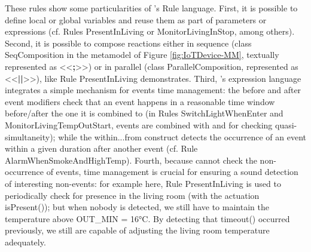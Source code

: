 These rules show some particularities of \IOTDSL's Rule language. First, it is possible to define local or global variables and reuse them as part of parameters or expressions (cf. Rules \textsf{PresentInLiving} or \textsf{MonitorLivingInStop}, among others). Second, it is possible to compose reactions either in sequence (class \textsf{SeqComposition} in the metamodel of Figure \ref{fig:IoTDevice-MM}, textually represented as \textsf{<<\textbf{;}>>}) or in parallel (class \textsf{ParallelComposition}, represented as <<\textsf{\textbf{||}}>>), like Rule \textsf{PresentInLiving} demonstrates. Third, \IOTDSL's expression language integrates a simple mechanism for events time management: the \textsf{before} and \textsf{after} event modifiers check that an event happens in a reasonable time window before/after the one it is combined to (in Rules \textsf{SwitchLightWhenEnter} and \textsf{MonitorLivingTempOutStart}, events are combined with \textsf{and} for checking quasi-simultaneity); while the \textsf{within...from} construct detects the occurrence of an event within a given duration after another event (cf. Rule \textsf{AlarmWhenSmokeAndHighTemp}). Fourth, because \IOTDSL cannot check the non-occurrence of events, time management is crucial for ensuring a sound detection of interesting non-events: for example here, Rule \textsf{PresentInLiving} is used to periodically check for presence in the living room (with the actuation \textsf{isPresent()}); but when nobody is detected, we still have to maintain the temperature above \textsf{OUT\_MIN} = 16°C. By detecting that \textsf{timeout()} occurred previously, we still are capable of adjusting the living room temperature adequately.
